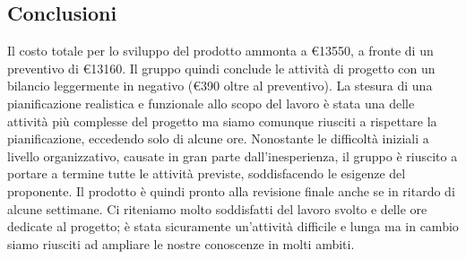 \subsection{Conclusioni}
Il costo totale per lo sviluppo del prodotto ammonta a €13550, a fronte di un preventivo di €13160. Il gruppo quindi conclude le attività di progetto con un bilancio leggermente in negativo (€390 oltre al preventivo).
La stesura di una pianificazione realistica e funzionale allo scopo del lavoro è stata una delle attività più complesse del progetto ma siamo comunque riusciti a rispettare la pianificazione, eccedendo solo di alcune ore.
Nonostante le difficoltà iniziali a livello organizzativo, causate in gran parte dall'inesperienza, il gruppo è riuscito a portare a termine tutte le attività previste,
soddisfacendo le esigenze del proponente. Il prodotto è quindi pronto alla revisione finale anche se in ritardo di alcune settimane. Ci riteniamo molto soddisfatti del lavoro svolto e delle ore dedicate al progetto; è stata sicuramente un'attività difficile e lunga ma in cambio siamo riusciti ad ampliare le nostre conoscenze in molti ambiti.
